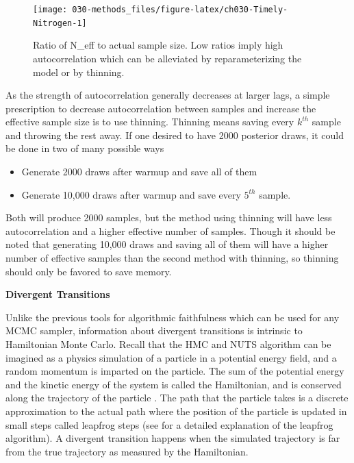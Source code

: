 \documentclass[11pt, oneside, openany]{scrbook}
\providecommand{\tightlist}{%
  \setlength{\itemsep}{0pt}\setlength{\parskip}{0pt}}
\begin{document}
\begin{figure}

{\centering \texttt{[image: 030-methods\_files/figure-latex/ch030-Timely-Nitrogen-1]} 

}

\caption{Ratio of N\_eff to actual sample size. Low ratios imply high autocorrelation which can be alleviated by reparameterizing the model or by thinning.}\label{fig:ch030-Timely-Nitrogen}
\end{figure}

As the strength of autocorrelation generally decreases at larger lags, a simple prescription to decrease autocorrelation between samples and increase the effective sample size is to use thinning. Thinning means saving every \(k^{th}\) sample and throwing the rest away. If one desired to have 2000 posterior draws, it could be done in two of many possible ways

\begin{itemize}
\tightlist
\item
  Generate 2000 draws after warmup and save all of them
\item
  Generate 10,000 draws after warmup and save every \(5^{th}\) sample.
\end{itemize}

Both will produce 2000 samples, but the method using thinning will have less autocorrelation and a higher effective number of samples. Though it should be noted that generating 10,000 draws and saving all of them will have a higher number of effective samples than the second method with thinning, so thinning should only be favored to save memory.

\textbf{Divergent Transitions}

Unlike the previous tools for algorithmic faithfulness which can be used for any MCMC sampler, information about divergent transitions is intrinsic to Hamiltonian Monte Carlo. Recall that the HMC and NUTS algorithm can be imagined as a physics simulation of a particle in a potential energy field, and a random momentum is imparted on the particle. The sum of the potential energy and the kinetic energy of the system is called the Hamiltonian, and is conserved along the trajectory of the particle \citep{stanref}. The path that the particle takes is a discrete approximation to the actual path where the position of the particle is updated in small steps called leapfrog steps (see \citet{leimkuhler2004simulating} for a detailed explanation of the leapfrog algorithm). A divergent transition happens when the simulated trajectory is far from the true trajectory as measured by the Hamiltonian.
\end{document}
